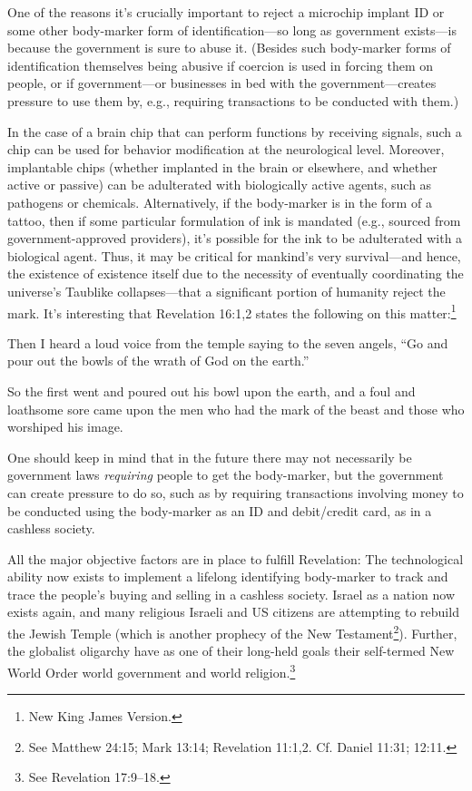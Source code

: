 \documentclass[letterpaper,12pt]{article}
\newenvironment{squotation}
  {\small\quotation}
  {\endquotation\normalsize}
\begin{document}
One of the reasons it's crucially important to reject a microchip implant ID or some other body-marker form of identification---so long as government exists---is because the government is sure to abuse it. (Besides such body-marker forms of identification themselves being abusive if coercion is used in forcing them on people, or if government---or businesses in bed with the government---creates pressure to use them by, e.g., requiring transactions to be conducted with them.)

In the case of a brain chip that can perform functions by receiving signals, such a chip can be used for behavior modification at the neurological level. Moreover, implantable chips (whether implanted in the brain or elsewhere, and whether active or passive) can be adulterated with biologically active agents, such as pathogens or chemicals. Alternatively, if the body-marker is in the form of a tattoo, then if some particular formulation of ink is mandated (e.g., sourced from government-approved providers), it's possible for the ink to be adulterated with a biological agent. Thus, it may be critical for mankind's very survival---and hence, the existence of existence itself due to the necessity of eventually coordinating the universe's Taublike collapses---that a significant portion of humanity reject the mark. It's interesting that Revelation 16:1,2 states the following on this matter:\footnote{New King James Version.}

\begin{squotation}
Then I heard a loud voice from the temple saying to the seven angels, ``Go and pour out the bowls of the wrath of God on the earth.''

So the first went and poured out his bowl upon the earth, and a foul and loathsome sore came upon the men who had the mark of the beast and those who worshiped his image.
\end{squotation}

One should keep in mind that in the future there may not necessarily be government laws \emph{requiring} people to get the body-marker, but the government can create pressure to do so, such as by requiring transactions involving money to be conducted using the body-marker as an ID and debit\slash credit card, as in a cashless society.

All the major objective factors are in place to fulfill Revelation: The technological ability now exists to implement a lifelong identifying body-marker to track and trace the people's buying and selling in a cashless society. Israel as a nation now exists again, and many religious Israeli and US citizens are attempting to rebuild the Jewish Temple (which is another prophecy of the New Testament\footnote{See Matthew 24:15; Mark 13:14; Revelation 11:1,2. Cf. Daniel 11:31; 12:11.}). Further, the globalist oligarchy have as one of their long-held goals their self-termed New World Order world government and world religion.\footnote{See Revelation 17:9--18.}
\end{document}
